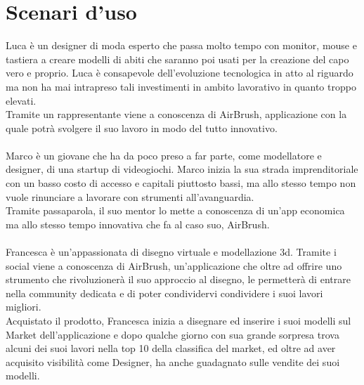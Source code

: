 \documentclass[11pt,fleqn]{book} %
\begin{document}
\section{Scenari d'uso}
Luca è un designer di moda esperto che passa molto tempo con monitor, mouse e tastiera a creare modelli di abiti che saranno poi usati per la creazione del capo vero e proprio. Luca è consapevole dell'evoluzione tecnologica in atto al riguardo ma non ha mai intrapreso tali investimenti in ambito lavorativo in quanto troppo elevati. \\
Tramite un rappresentante viene a conoscenza di AirBrush, applicazione con la quale potrà svolgere il suo lavoro in modo del tutto innovativo.
\\\\
Marco è un giovane che ha da poco preso a far parte, come modellatore e designer, di una startup di videogiochi.
Marco inizia la sua strada imprenditoriale con un basso costo di accesso e capitali piuttosto bassi, ma allo stesso tempo non vuole rinunciare a lavorare con strumenti all'avanguardia. \\
Tramite passaparola, il suo mentor lo mette a conoscenza di un'app economica ma allo stesso tempo innovativa che fa al caso suo, AirBrush.
\\\\
Francesca è un'appassionata di disegno virtuale e modellazione 3d. Tramite i social viene a conoscenza di AirBrush, un'applicazione che oltre ad offrire uno strumento che rivoluzionerà il suo approccio al disegno, le permetterà di entrare nella community dedicata e di poter condividervi condividere i suoi lavori migliori. \\Acquistato il prodotto, Francesca inizia a disegnare ed inserire i suoi modelli sul Market dell'applicazione e dopo qualche giorno con sua grande sorpresa trova alcuni dei suoi lavori nella top 10 della classifica del market, ed oltre ad aver acquisito visibilità come Designer, ha anche guadagnato sulle vendite dei suoi modelli.
\end{document}
